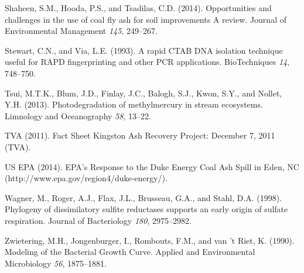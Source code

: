 \documentclass[ms, hidelinks]{uncgdissertationexp}
\theoremstyle{plain}
\theoremstyle{definition}
\theoremstyle{remark}
\begin{document}
\leavevmode\hypertarget{ref-shaheenOpportunitiesChallengesUse2014}{}%
Shaheen, S.M., Hooda, P.S., and Tsadilas, C.D. (2014). Opportunities and challenges in the use of coal fly ash for soil improvements A review. Journal of Environmental Management \emph{145}, 249--267.

\leavevmode\hypertarget{ref-stewartRapidCTABDNA1993}{}%
Stewart, C.N., and Via, L.E. (1993). A rapid CTAB DNA isolation technique useful for RAPD fingerprinting and other PCR applications. BioTechniques \emph{14}, 748--750.

\leavevmode\hypertarget{ref-tsuiPhotodegradationMethylmercuryStream2013}{}%
Tsui, M.T.K., Blum, J.D., Finlay, J.C., Balogh, S.J., Kwon, S.Y., and Nollet, Y.H. (2013). Photodegradation of methylmercury in stream ecosystems. Limnology and Oceanography \emph{58}, 13--22.

\leavevmode\hypertarget{ref-tvaFactSheetKingston2011}{}%
TVA (2011). Fact Sheet Kingston Ash Recovery Project: December 7, 2011 (TVA).

\leavevmode\hypertarget{ref-usepaEPAResponseDuke2014}{}%
US EPA (2014). EPA's Response to the Duke Energy Coal Ash Spill in Eden, NC (http://www.epa.gov/region4/duke-energy/).

\leavevmode\hypertarget{ref-wagnerPhylogenyDissimilatorySulfite1998}{}%
Wagner, M., Roger, A.J., Flax, J.L., Brusseau, G.A., and Stahl, D.A. (1998). Phylogeny of dissimilatory sulfite reductases supports an early origin of sulfate respiration. Journal of Bacteriology \emph{180}, 2975--2982.

\leavevmode\hypertarget{ref-zwieteringModelingBacterialGrowth1990}{}%
Zwietering, M.H., Jongenburger, I., Rombouts, F.M., and van 't Riet, K. (1990). Modeling of the Bacterial Growth Curve. Applied and Environmental Microbiology \emph{56}, 1875--1881.



\end{document}
